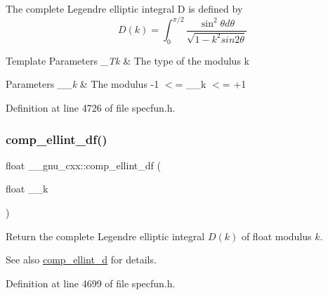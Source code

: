 The complete Legendre elliptic integral D is defined by \[ D(k) = \int_0^{\pi/2} \frac{\sin^2\theta d\theta}{\sqrt{1-k^2sin2\theta}} \]


\begin{DoxyTemplParams}{Template Parameters}
{\em \+\_\+\+Tk} & The type of the modulus {\ttfamily k} \\
\hline
\end{DoxyTemplParams}

\begin{DoxyParams}{Parameters}
{\em \+\_\+\+\_\+k} & The modulus {\ttfamily -\/1 $<$= \+\_\+\+\_\+k $<$= +1} \\
\hline
\end{DoxyParams}


Definition at line 4726 of file specfun.\+h.

\mbox{\label{group__gnu__math__spec__func_ga34ac6488b0e7531d5d4b7a8e31ff864e}} 
\subsubsection{\texorpdfstring{comp\+\_\+ellint\+\_\+df()}{comp\_ellint\_df()}}
{\footnotesize\ttfamily float \+\_\+\+\_\+gnu\+\_\+cxx\+::comp\+\_\+ellint\+\_\+df (\begin{DoxyParamCaption}\item[{float}]{\+\_\+\+\_\+k }\end{DoxyParamCaption})\hspace{0.3cm}{\ttfamily [inline]}}

Return the complete Legendre elliptic integral $ D(k) $ of {\ttfamily float} modulus $ k $.

\begin{DoxySeeAlso}{See also}
\hyperlink{group__gnu__math__spec__func_ga3fe79a91524b43ffc5ffb83c0eb2bd00}{comp\+\_\+ellint\+\_\+d} for details. 
\end{DoxySeeAlso}


Definition at line 4699 of file specfun.\+h.

\mbox{\label{group__gnu__math__spec__func_ga494931ec0a271b79f1fdcfdf929e3138}} 
